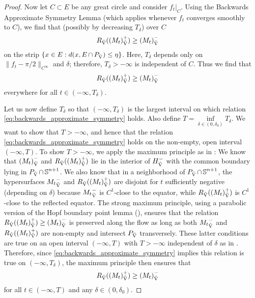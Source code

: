 \documentclass{amsart}
\theoremstyle{definition}
\theoremstyle{remark}
\numberwithin{equation}{section}
\begin{document}
\begin{proof}
Now let \(C\subset E\) be any great circle and consider \(f_t|_C\). Using the Backwards Approximate Symmetry Lemma \cite[Lemma 5.1]{Br-Lou} (which applies whenever \(f_t\) converges smoothly to \(C\)), we find that (possibly by decreasing \(T_{\delta}\)) over \(C\)
\[
R_{\operatorname{\vec{V}}}({(M_t)}_{\operatorname{\vec{V}}}^+) \geq {(M_t)}_{\operatorname{\vec{V}}}^-
\]
on the strip \(\{x \in E: d(x, E \operatorname{\cap} P_{\operatorname{\vec{V}}}) \leq \eta\}\). Here, \(T_{\delta}\) depends only on \(\|f_t - \pi/2\|_{C^{\infty}}\) and \(\delta\); therefore, \(T_{\delta} > - \infty\) is independent of \(C\). Thus we find that
\begin{equation}
\label{eq:backwards_approximate_symmetry}
R_{\operatorname{\vec{V}}}({(M_t)}_{\operatorname{\vec{V}}}^+) \geq {(M_t)}_{\operatorname{\vec{V}}}^-
\end{equation}
everywhere for all \(t \in (-\infty, T_{\delta})\). 

\textcolor[rgb]{1.00,0.00,0.00}{Let us now define \(T_{\delta}\) so that \((-\infty, T_{\delta})\) is the largest interval on which relation \eqref{eq:backwards_approximate_symmetry} holds. Also define \(T = \inf\limits_{\delta \in (0,\delta_0)} T_{\delta}\). We want to show that \(T > -\infty\), and hence that the relation \eqref{eq:backwards_approximate_symmetry} holds on the non-empty, open interval \((-\infty, T)\). To show $T>-\infty$, we apply the maximum principle as in \cite[Lemma 5.2]{Br-Lou}: We know that \({(M_t)}_{\operatorname{\vec{V}}}^-\) and \(R_{\operatorname{\vec{V}}}({(M_t)}_{\operatorname{\vec{V}}}^+)\) lie in the interior of \({H}_{{\operatorname{\vec{V}}}}^-\) with the common boundary lying in \(P_{\operatorname{\vec{V}}} \operatorname{\cap} \operatorname{\mathbb{S}}^{n+1}\). We also know that in a neighborhood of \(P_{\operatorname{\vec{V}}} \operatorname{\cap} \operatorname{\mathbb{S}}^{n+1}\), the hypersurfaces \({M_t}_{\operatorname{\vec{V}}}^-\) and \(R_{\operatorname{\vec{V}}}({(M_t)}_{\operatorname{\vec{V}}}^+)\) are disjoint for \(t\) sufficiently negative (depending on \(\delta\)) because \({M_t}_{\operatorname{\vec{V}}}^-\) is \(C^1\)-close to the equator, while \(R_{\operatorname{\vec{V}}}({(M_t)}_{\operatorname{\vec{V}}}^+)\) is \(C^1\)-close to the reflected equator. The strong maximum principle, using a parabolic version of the Hopf boundary point lemma (\cite{Chow 97}), ensures that the relation \(R_{\operatorname{\vec{V}}}({(M_t)}_{\operatorname{\vec{V}}}^+) \geq {(M_t)}_{\operatorname{\vec{V}}}^-\) is preserved along the flow as long as both \({M_t}_{\operatorname{\vec{V}}}^-\) and \(R_{\operatorname{\vec{V}}}({(M_t)}_{\operatorname{\vec{V}}}^+)\) are non-empty and intersect \(P_{\operatorname{\vec{V}}}\) transversely. These latter conditions are true on an open interval \((-\infty, T)\) with \(T>-\infty\) independent of \(\delta\) as in \cite[Lemma 5.2]{Br-Lou}. Therefore, since \eqref{eq:backwards_approximate_symmetry} implies this relation is true on \((-\infty, T_{\delta})\), the maximum principle then ensures that
\begin{equation*}
\label{eq:longtime_approximate_symmetry}
R_{\operatorname{\vec{V}}}({(M_t)}_{\operatorname{\vec{V}}}^+) \geq {(M_t)}_{\operatorname{\vec{V}}}^-
\end{equation*}
for all \(t \in (-\infty, T)\) and any \(\delta \in (0,\delta_0)\).}


\end{proof}
\end{document}
